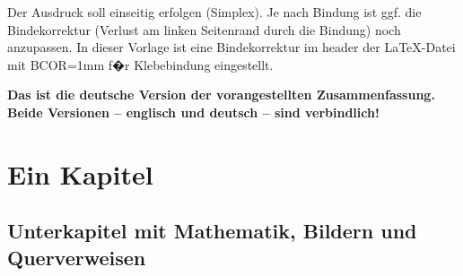 Der Ausdruck soll einseitig erfolgen (Simplex). Je nach Bindung ist ggf. die Bindekorrektur (Verlust am linken Seitenrand durch die Bindung) noch anzupassen. In dieser Vorlage ist eine Bindekorrektur im header der \LaTeX-Datei mit BCOR=1mm f�r Klebebindung eingestellt.

{\bfseries Das ist die deutsche Version der vorangestellten Zusammenfassung. Beide Versionen -- englisch und deutsch -- sind verbindlich!}



\chapter{Ein Kapitel}
\label{chapter:Menschliches Sehen}

\section{Unterkapitel mit Mathematik, Bildern und Querverweisen}

